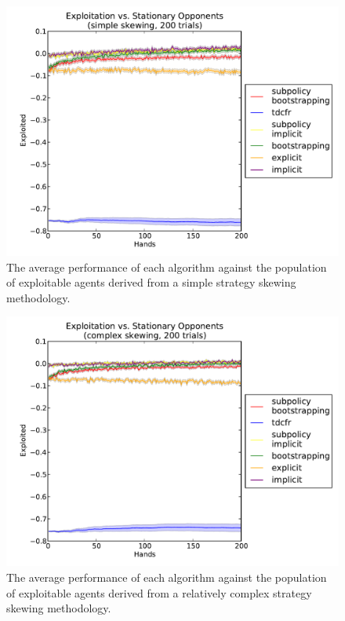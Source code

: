 \documentclass{aamas2013}
\begin{document}
\begin{figure}[tbh]
\centering
  \includegraphics[scale=.4]{exploited_simple_tdcfr.pdf}
\caption{The average performance of each algorithm against the population of exploitable agents derived from a simple strategy skewing methodology.}
\label{fig-exploitedsimple-tdcfr}
\end{figure}

\begin{figure}[tbh]
\centering
  \includegraphics[scale=.4]{exploited_complex_tdcfr.pdf}
\caption{The average performance of each algorithm against the population of exploitable agents derived from a relatively complex strategy skewing methodology.}
\label{fig-exploitedcomplex-tdcfr}
\end{figure}
\end{document}
